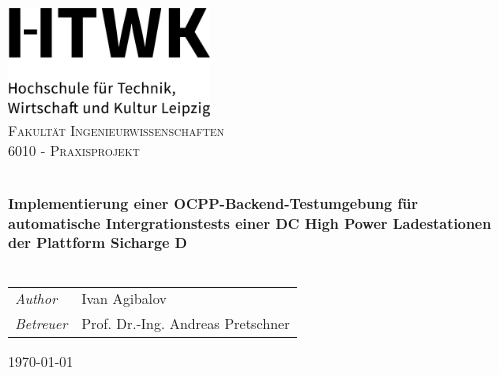 
\begin{titlepage}
\vbox{ }
\vbox{ }
\begin{center}

\includegraphics[width=0.40\textwidth,center]{Images/HTWK_Zusatz_de_V_Black.jpg}\\[1cm]

\textsc{\LARGE Fakultät Ingenieurwissenschaften}\\[1.5cm]
\textsc{\Large 6010 - Praxisprojekt}\\[0.5cm]
\vbox{ }

\HRule \\[0.4cm]
{ \huge \bfseries Implementierung einer OCPP-Backend-Testumgebung für automatische Intergrationstests einer DC High Power Ladestationen der Plattform Sicharge D}\\[0.4cm]
\HRule \\[1.5cm]

\begin{table}[h]
\large
    \centering
    \begin{tabular}{ll}
        \emph{Author} & Ivan Agibalov \\
        \emph{Betreuer} & Prof. Dr.-Ing. Andreas Pretschner  
    \end{tabular}
\end{table}

\vfill
{\large \today}
\end{center}
\end{titlepage}